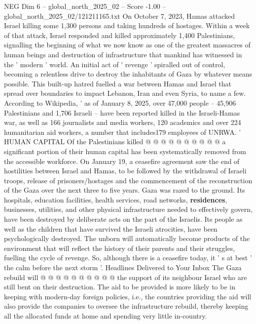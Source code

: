 \begin{textsample}{NEG Dim 6 – global\_north\_2025\_02 – Score -1.00 – global\_north\_2025\_02/121211165.txt}  \label{ex:f6_neg_111}
On October 7, 2023, Hamas attacked Israel killing some 1,300 persons and taking hundreds of hostages.
Within a week of that attack, Israel responded and killed approximately 1,400 Palestinians, signalling the beginning of what we now know as one of the greatest massacres of human beings and destruction of infrastructure that mankind has witnessed in the ' modern ' world.
An initial act of ' revenge ' spiralled out of control, becoming a relentless drive to destroy the inhabitants of Gaza by whatever means possible.
This built-up hatred fuelled a war between Hamas and Israel that spread over boundaries to impact Lebanon, Iran and even Syria, to name a few.
According to Wikipedia, ' as of January 8, 2025, over 47,000 people -- 45,906 Palestinians and 1,706 Israeli -- have been reported killed in the Israeli-Hamas war, as well as 166 journalists and media workers, 120 academics and over 224 humanitarian aid workers, a number that includes179 employees of UNRWA. ' HUMAN CAPITAL Of the Palestinians killed @ @ @ @ @ @ @ @ @ @ a significant portion of their human capital has been systematically removed from the accessible workforce.
On January 19, a ceasefire agreement saw the end of hostilities between Israel and Hamas, to be followed by the withdrawal of Israeli troops, release of prisoners/hostages and the commencement of the reconstruction of the Gaza over the next three to five years.
Gaza was razed to the ground.
Its hospitals, education facilities, health services, road networks, \textbf{residences}, businesses, utilities, and other physical infrastructure needed to effectively govern, have been destroyed by deliberate acts on the part of the Israelis.
Its people as well as the children that have survived the Israeli atrocities, have been psychologically destroyed.
The unborn will automatically become products of the environment that will reflect the history of their parents and their struggles, fuelling the cycle of revenge.
So, although there is a ceasefire today, it ' s at best ' the calm before the next storm '.
Headlines Delivered to Your Inbox The Gaza rebuild will @ @ @ @ @ @ @ @ @ @ the support of its neighbour Israel who are still bent on their destruction.
The aid to be provided is more likely to be in keeping with modern-day foreign policies, i.e., the countries providing the aid will also provide the companies to oversee the infrastructure rebuild, thereby keeping all the allocated funds at home and spending very little in-country.

\end{textsample}
